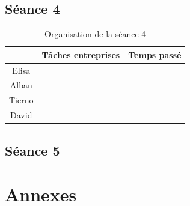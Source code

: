 \documentclass{rapport}
\begin{document}
\subsection{Séance 4}

\begin{table}[htbp]
	\centering 
	\begin{tabular}{c|c|c}
		& Tâches entreprises& Temps passé\\ \hline
		Elisa& & \\ \hline
		Alban& & \\ \hline
		Tierno& & \\ \hline
		David& & 
	\end{tabular}
	\caption{Organisation de la séance 4}
\end{table}

\subsection{Séance 5} %

\newpage

\section{Annexes}

\lstset{style=mystyle}
\end{document}
